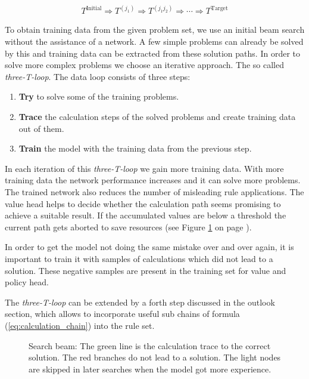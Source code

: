 \documentclass{scrartcl}
\theoremstyle{definition}
\begin{document}
\begin{align}
	T^\text{Initial} \Longrightarrow T^{(j_1)} \Longrightarrow T^{(j_1j_2)} \Longrightarrow \cdots \Longrightarrow T^\text{Target}
	\label{eq:calculation_chain}
\end{align}

To obtain training data from the given problem set, we use an initial beam search without the assistance of a network.
A few simple problems can already be solved by this and training data can be extracted from these solution paths.
In order to solve more complex problems we choose an iterative approach.
The so called \textit{three-T-loop}.
The data loop consists of three steps:


\begin{enumerate}[label=(\roman*)]
	\item \textbf{Try} to solve some of the training problems.
	\item \textbf{Trace} the calculation steps of the solved problems and create training data out of them. 
	\item \textbf{Train} the model with the training data from the previous step.
\end{enumerate}

In each iteration of this \textit{three-T-loop} we gain more training data.
With more training data the network performance increases and it can solve more problems.
The trained network also reduces the number of misleading rule applications.
The value head helps to decide whether the calculation path seems promising to achieve a suitable result.
If the accumulated values are below a threshold the current path gets aborted to save resources (see Figure \ref{fig:beam_search} on page \pageref{fig:beam_search}). 

In order to get the model not doing the same mistake over and over again, it is important to train it with samples of calculations which did not lead to a solution. 
These negative samples are present in the training set for value and policy head.


The \textit{three-T-loop} can be extended by a forth step discussed in the outlook section, which allows to incorporate useful sub chains of formula (\ref{eq:calculation_chain}) into the rule set.

\begin{figure}[!htbp]
	\centering
	
	\caption{Search beam: The green line is the calculation trace to the correct solution.
	The red branches do not lead to a solution.
	The light nodes are skipped in later searches when the model got more experience.}
	\label{fig:beam_search}
\end{figure}
\end{document}
